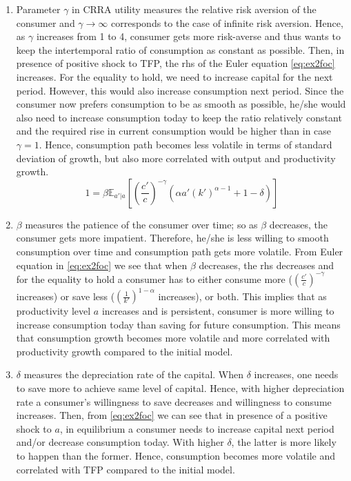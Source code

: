 \documentclass[]{article}
\begin{document}
\begin{enumerate}[label = \alph*)]
	\item Parameter $\gamma$ in CRRA utility measures the relative risk aversion of the consumer and $\gamma\to\infty$ corresponds to the case of infinite risk aversion. Hence, as $\gamma$ increases from 1 to 4, consumer gets more risk-averse and thus wants to keep the intertemporal ratio of consumption as constant as possible. Then, in presence of positive shock to TFP, the rhs of the Euler equation \eqref{eq:ex2foc} increases. For the equality to hold, we need to increase capital for the next period. However, this would also increase consumption next period. Since the consumer now prefers consumption to be as smooth as possible, he/she would also need to increase consumption today to keep the ratio relatively constant and the required rise in current consumption would be higher than in case $\gamma = 1$. Hence, consumption path becomes less volatile in terms of standard deviation of growth, but also more correlated with output and productivity growth.
	\begin{equation}
		1 = \beta\mathbb{E}_{a'|a}\left[(\frac{c'}{c})^{-\gamma}(\alpha a'(k')^{\alpha - 1} + 1 - \delta)\right]
		\label{eq:ex2foc}
	\end{equation}
	
	\item $\beta$ measures the patience of the consumer over time; so as $\beta$ decreases, the consumer gets more impatient. Therefore, he/she is less willing to smooth consumption over time and consumption path gets more volatile. From Euler equation in \eqref{eq:ex2foc} we see that when $\beta$ decreases, the rhs decreases and for the equality to hold a consumer has to either consume more ($(\frac{c'}{c})^{-\gamma}$ increases) or save less ($(\frac{1}{k'})^{1 - \alpha}$ increases), or both. This implies that as productivity level $a$ increases and is persistent, consumer is more willing to increase consumption today than saving for future consumption. This means that consumption growth becomes more volatile and more correlated with productivity growth compared to the initial model.
	
	\item $\delta$ measures the depreciation rate of the capital. When $\delta$ increases, one needs to save more to achieve same level of capital. Hence, with higher depreciation rate a consumer's willingness to save decreases and willingness to consume increases. Then, from \eqref{eq:ex2foc} we can see that in presence of a positive shock to $a$, in equilibrium a consumer needs to increase capital next period and/or decrease consumption today. With higher $\delta$, the latter is more likely to happen than the former. Hence, consumption becomes more volatile and correlated with TFP compared to the initial model.
	

\end{enumerate}
\end{document}
